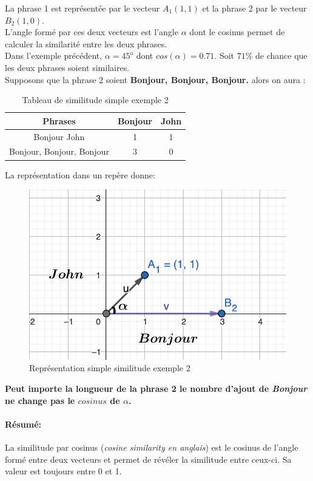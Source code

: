 \documentclass[a4paper, 14pt]{article}
\begin{document}
	La phrase 1 est représentée par le vecteur $A_{1}(1, 1)$ et la phrase 2 par le vecteur $B_{2}(1, 0)$.\\
	L'angle formé par ces deux vecteurs est l'angle $\alpha$ dont le cosinus permet de calculer la similarité entre les deux phrases.\\
	Dans l'exemple précédent, $\alpha=45^{o}$ dont $cos(\alpha)=0.71$. Soit $71\%$ de chance que les deux phrases soient similaires.\\
	Supposons que la phrase 2 soient \textbf{Bonjour, Bonjour, Bonjour.} alors on aura :
		\begin{table}[H]
		\centering
		\begin{tabular}{|c|c|c|}
			\hline
			\textbf{Phrases} & \textbf{Bonjour} & \textbf{John} \\
			\hline
			Bonjour John & 1 & 1 \\
			Bonjour, Bonjour, Bonjour  & 3 & 0 \\
			\hline
		\end{tabular}
		\caption{Tableau de similitude simple exemple 2}
		\label{tab:exemplesimple}
	\end{table}
	La représentation dans un repère donne:
	 \begin{figure}[H]
		\includegraphics[scale=0.5, width=15cm]{./img/vecteur_exemple_simple_example2.png}
		\caption{Représentation simple similitude exemple 2}
	\end{figure}
	\textbf{Peut importe la longueur de  la phrase 2 le nombre d'ajout de \textit{Bonjour} ne change pas le $cosinus$ de $\alpha$.}
    \paragraph{Résumé:} La similitude par cosinus (\textit{cosine similarity en anglais}) est le cosinus de l'angle formé entre deux vecteurs et permet de révéler la similitude entre ceux-ci. Sa valeur est toujours entre 0 et 1.
\end{document}

